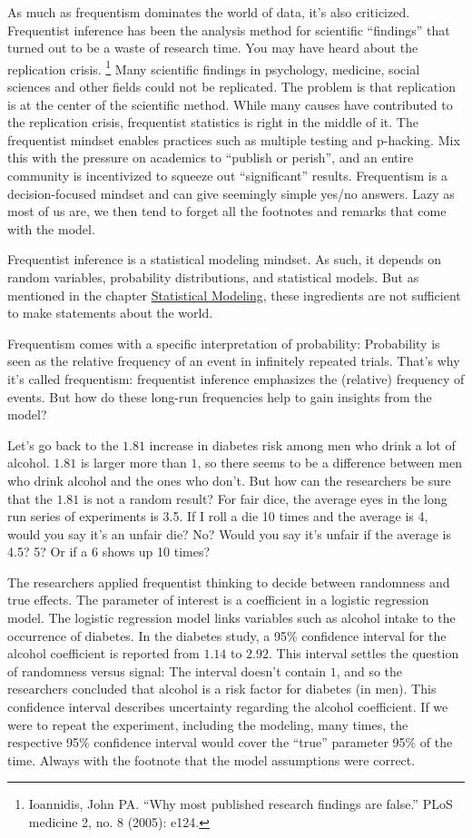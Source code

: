 \documentclass[
  10pt,
]{scrbook}
\begin{document}
As much as frequentism dominates the world of data, it's also criticized.
Frequentist inference has been the analysis method for scientific ``findings'' that turned out to be a waste of research time.
You may have heard about the replication crisis. \footnote{Ioannidis, John PA. ``Why most published research findings are false.'' PLoS medicine 2, no. 8 (2005): e124.}
Many scientific findings in psychology, medicine, social sciences and other fields could not be replicated.
The problem is that replication is at the center of the scientific method.
While many causes have contributed to the replication crisis, frequentist statistics is right in the middle of it.
The frequentist mindset enables practices such as multiple testing and p-hacking.
Mix this with the pressure on academics to ``publish or perish'', and an entire community is incentivized to squeeze out ``significant'' results.
Frequentism is a decision-focused mindset and can give seemingly simple yes/no answers.
Lazy as most of us are, we then tend to forget all the footnotes and remarks that come with the model.

Frequentist inference is a statistical modeling mindset.
As such, it depends on random variables, probability distributions, and statistical models.
But as mentioned in the chapter \protect\hyperlink{statistical-modeling}{Statistical Modeling}, these ingredients are not sufficient to make statements about the world.

Frequentism comes with a specific interpretation of probability:
Probability is seen as the relative frequency of an event in infinitely repeated trials.
That's why it's called frequentism: frequentist inference emphasizes the (relative) frequency of events.
But how do these long-run frequencies help to gain insights from the model?

Let's go back to the \(1.81\) increase in diabetes risk among men who drink a lot of alcohol.
\(1.81\) is larger more than \(1\), so there seems to be a difference between men who drink alcohol and the ones who don't.
But how can the researchers be sure that the \(1.81\) is not a random result?
For fair dice, the average eyes in the long run series of experiments is 3.5.
If I roll a die 10 times and the average is 4, would you say it's an unfair die?
No? Would you say it's unfair if the average is 4.5? 5? Or if a 6 shows up 10 times?

The researchers applied frequentist thinking to decide between randomness and true effects.
The parameter of interest is a coefficient in a logistic regression model.
The logistic regression model links variables such as alcohol intake to the occurrence of diabetes.
In the diabetes study, a 95\% confidence interval for the alcohol coefficient is reported from \(1.14\) to \(2.92\).
This interval settles the question of randomness versus signal:
The interval doesn't contain \(1\), and so the researchers concluded that alcohol is a risk factor for diabetes (in men).
This confidence interval describes uncertainty regarding the alcohol coefficient.
If we were to repeat the experiment, including the modeling, many times, the respective 95\% confidence interval would cover the ``true'' parameter 95\% of the time.
Always with the footnote that the model assumptions were correct.
\end{document}
